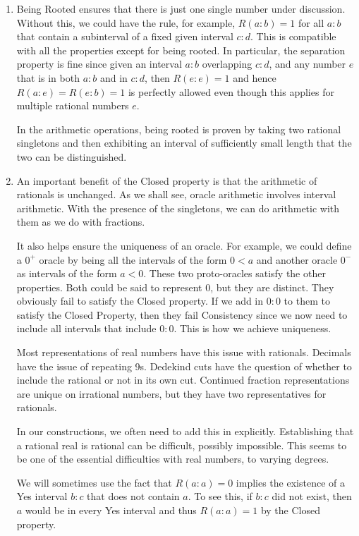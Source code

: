 \documentclass[12pt]{article}
\begin{document}
\begin{enumerate}
    \item Being Rooted ensures that there is just one single number under discussion. Without this, we could have the rule, for example, $R(a:b) = 1$ for all $a:b$ that contain a subinterval of a fixed given interval $c:d$. This is compatible with all the properties except for being rooted. In particular, the separation property is fine since given an interval $a:b$ overlapping  $c:d$, and any number $e$ that is in both $a:b$ and in $c:d$, then $R(e:e) = 1$ and hence $R(a:e)=R(e:b) = 1$ is perfectly allowed even though this applies for multiple rational numbers $e$.
    
    In the arithmetic operations, being rooted is proven by taking two rational singletons and then exhibiting an interval of sufficiently small length that the two can be distinguished. 

    \item An important benefit of the Closed property is that the arithmetic of rationals is unchanged. As we shall see, oracle arithmetic involves interval arithmetic. With the presence of the singletons, we can do arithmetic with them as we do with fractions. 
    
    It also helps ensure the uniqueness of an oracle. For example, we could define a $0^+$ oracle by being all the intervals of the form $0\lt a$ and another oracle $0^-$ as intervals of the form $a \lt 0$. These two proto-oracles satisfy the other properties. Both could be said to represent $0$, but they are distinct. They obviously fail to satisfy the Closed property. If we add in $0:0$ to them to satisfy the Closed Property, then they fail Consistency since we now need to include all intervals that include $0:0$. This is how we achieve uniqueness. 
    
    Most representations of real numbers have this issue with rationals. Decimals have the issue of repeating 9s. Dedekind cuts have the question of whether to include the rational or not in its own cut. Continued fraction representations are unique on irrational numbers, but they have two representatives for rationals. 
    
    In our constructions, we often need to add this in explicitly. Establishing that a rational real is rational can be difficult, possibly impossible. This seems to be one of the essential difficulties with real numbers, to varying degrees.

    We will sometimes use the fact that $R(a:a)=0$ implies the existence of a Yes interval $b:c$ that does not contain $a$. To see this, if $b:c$ did not exist, then $a$ would be in every Yes interval and thus $R(a:a)=1$ by the Closed property. 

\end{enumerate}
\end{document}
